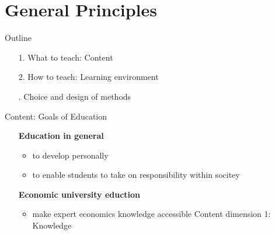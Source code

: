 \section*{General Principles}

\begin{frame}{Outline}
\begin{itemize}[<+->]
	\item[1.] What to teach: Content 
	\item[2.] How to teach: Learning environment
	\item[\ar 3.] Choice and design of methods
\end{itemize}
\end{frame}
\begin{frame}{Content: Goals of Education}
	\pause
	\centering
	\vspace{-4mm}
	\begin{itemize}[<+->]
\item[] \hspace{-10mm} \centering \textbf{Education in general}
\begin{itemize}
	\item  to develop personally 
	\item to enable students to take on responsibility within socitey %
\end{itemize}
\vspace{2mm}
\item[] \hspace{-10mm} \centering \textbf{Economic university eduction}
\begin{itemize}
	\item make expert economics knowledge accessible \ar \alert{Content dimension 1: Knowledge}\\

\end{itemize}
\end{itemize}
\end{frame}
